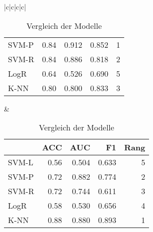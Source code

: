 \documentclass[
]{article}
\begin{document}
\begin{landscape}
\begin{table}[h]
\begin{center}
\begin{tabular}{|c|c|c|c|}
\begin{tabular}{lrrrr}
SVM-P & 0.84 & 0.912 & 0.852 & 1\\
SVM-R & 0.84 & 0.886 & 0.818 & 2\\
LogR & 0.64 & 0.526 & 0.690 & 5\\
K-NN & 0.80 & 0.800 & 0.833 & 3\\
\bottomrule
\end{tabular}  &  
\begin{tabular}{lrrrr}
\toprule
  & ACC & AUC & F1 & Rang\\
\midrule
SVM-L & 0.56 & 0.504 & 0.633 & 5\\
SVM-P & 0.72 & 0.882 & 0.774 & 2\\
SVM-R & 0.72 & 0.744 & 0.611 & 3\\
LogR & 0.58 & 0.530 & 0.656 & 4\\
K-NN & 0.88 & 0.880 & 0.893 & 1\\
\bottomrule
\end{tabular}  \\ \hline \end{tabular} \end{center} \caption{Vergleich der Modelle} \end{table}

\end{landscape}

\printbibliography
\end{document}

